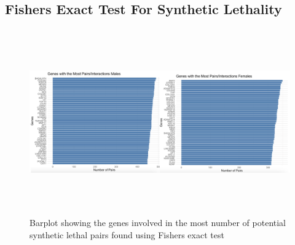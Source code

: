 \documentclass[10pt]{article}
\begin{document}
	\subsection{Fishers Exact Test For Synthetic Lethality}
	
	\begin{figure}[!h]
		\centering
		\includegraphics[width=\textwidth, height=8cm]{interactions.png}
		\caption{Barplot showing the genes involved in the most number of potential synthetic lethal pairs found using Fishers exact test}
		\label{fig:9}
	\end{figure}
\end{document}
